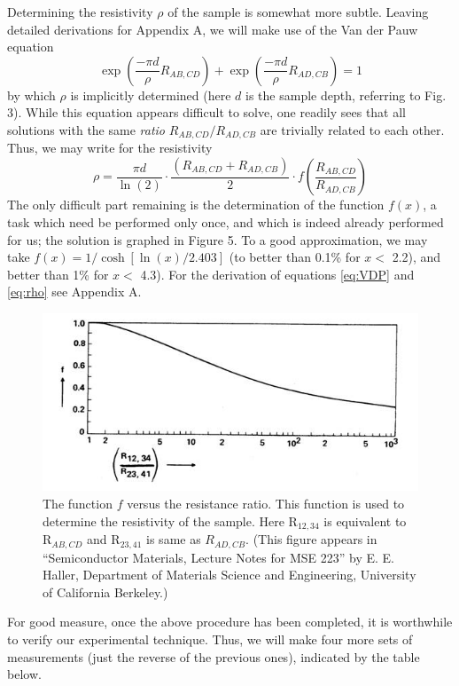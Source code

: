 \documentclass{../lab}
\begin{document}
Determining the resistivity $\rho$ of the sample is somewhat more subtle. Leaving detailed derivations for Appendix A, we will make use of the Van der Pauw equation
\begin{equation}\label{eq:VDP}
    \exp\left(\frac{-\pi d }{\rho}R_{AB,CD}\right)
    + \exp\left(\frac{-\pi d}{\rho}R_{AD,CB}\right) = 1
\end{equation}
by which $\rho$ is implicitly determined (here $d$ is the sample depth, referring to Fig. 3). While this equation appears difficult to solve, one readily sees that all solutions with the same \emph{ratio} $R_{AB,CD} / R_{AD,CB}$ are trivially related to each other. Thus, we may write for the resistivity
\begin{equation}\label{eq:rho}
    \rho = \frac{\pi d}{\ln(2)} \cdot \frac{(R_{AB,CD}+R_{AD,CB})}{2}\cdot f\left(\frac{R_{AB,CD}}{R_{AD,CB}}\right)
\end{equation}
The only difficult part remaining is the determination of the function $f(x)$, a task which need be performed only once, and which is indeed already performed for us; the solution is graphed in Figure 5. To a good approximation, we may take $f(x) = 1/\cosh[\ln(x)/2.403]$ (to better than 0.1\% for $x <$ 2.2), and better than 1\% for $x <$ 4.3). For the derivation of equations \ref{eq:VDP} and \ref{eq:rho} see Appendix A.

\begin{figure}[h]
    \centering
    \includegraphics[width=0.7\linewidth]{images/FvsResistanceRatio.jpg}
    \caption{The function $f$ versus the resistance ratio. This function is used to determine the resistivity of the sample. Here R$_{12,34}$ is equivalent to R$_{AB,CD}$ and R$_{23,41}$ is same as $R_{AD,CB}$. (This figure appears in ``Semiconductor Materials, Lecture Notes for MSE 223'' by E. E. Haller, Department of Materials Science and Engineering, University of California Berkeley.)}
\end{figure}

For good measure, once the above procedure has been completed, it is worthwhile to verify our experimental technique. Thus, we will make four more sets of measurements (just the reverse of the previous ones), indicated by the table below.

\end{document}
